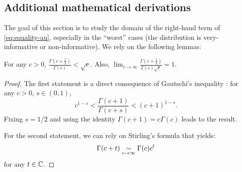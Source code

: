     
    
    
    
    
    
    
    
    \subsection{Additional mathematical derivations}\label{app:additionalmaths}
    
        The goal of this section is to study the domain of the right-hand term of \cref{eq:equality-au}, especially in the ``worst'' cases (the distribution is very-informative or non-informative).
        We rely on the following lemmas:
        \begin{lem}\label{lem:app-ineqG}
            For any $c>0$, $\displaystyle{\frac{\Gamma\left(c+\frac{1}{2}\right)}{\Gamma(c)}<\sqrt{c}}$. Also, $\displaystyle{
                \lim_{c\rightarrow\infty}\frac{\Gamma\left(c+\frac{1}{2}\right)}{\Gamma(c)\sqrt{c}}=1.
                }$
        \end{lem}
        \begin{proof}
            The first statement is a direct consequence of Gautschi's inequality \citep{gautschi_elementary_1959}: for any $c>0$, $s\in(0,1)$,
                \begin{equation}
                    c^{1-s}<\frac{\Gamma(c+1)}{\Gamma(c+s)}<(c+1)^{1-s}.
                \end{equation}
            Fixing $s=1/2$ and using the identity $\Gamma(c+1)=c\Gamma(c)$ leads to the result.
    
            For the second statement, we can rely on Stirling's formula \citep{davis_leonhard_1959} that yields:
                \begin{equation}
                    \Gamma(c+t) \underset{c\rightarrow\infty}{\sim} \Gamma(c)c^t
                \end{equation}
            for any $t\in\mathbb{C}$.
        \end{proof}
        
